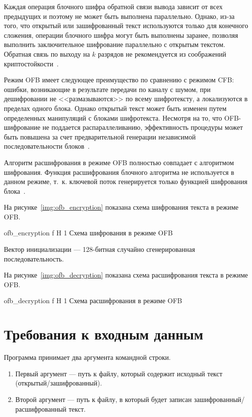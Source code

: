 \documentclass{bmstu}
\begin{document}
Каждая операция блочного шифра обратной связи вывода зависит от всех предыдущих и поэтому не может быть выполнена параллельно. 
Однако, из-за того, что открытый или зашифрованный текст используются только для конечного сложения, операции блочного шифра могут быть выполнены заранее, позволяя выполнить заключительное шифрование параллельно с открытым текстом. 
Обратная связь по выходу на $k$ разрядов не рекомендуется из соображений криптостойкости~\cite{wiki-ofb}.

Режим OFB имеет следующее преимущество по сравнению с режимом CFB: ошибки, возникающие в результате передачи по каналу с шумом, при дешифровании не <<размазываются>> по всему шифротексту, а локализуются в пределах одного блока. 
Однако открытый текст может быть изменен путем определенных манипуляций с блоками шифротекста. 
Несмотря на то, что OFB-шифрование не поддается распараллеливанию, эффективность процедуры может быть повышена за счет предварительной генерации независимой последовательности блоков~\cite{wiki-ofb}.

Алгоритм расшифрования в режиме OFB полностью совпадает с алгоритмом шифрования. Функция расшифрования блочного алгоритма не используется в данном режиме, т.~к. ключевой поток генерируется только функцией шифрования блока~\cite{wiki-ofb}.

На рисунке~\ref{img:ofb_encryption} показана схема шифрования текста в режиме OFB.

    {ofb_encryption}
    {f}
    {H}
    {1\textwidth}
    {Схема шифрования в режиме OFB~\cite{wiki-ofb}}
    
Вектор инициализации --- 128-битная случайно сгенерированная последовательность.

На рисунке~\ref{img:ofb_decryption} показана схема расшифрования текста в режиме OFB.

    {ofb_decryption}
    {f}
    {H}
    {1\textwidth}
    {Схема расшифрования в режиме OFB~\cite{wiki-ofb}}

\chapter{Требования к входным данным}

Программа принимает два аргумента командной строки.
\begin{enumerate}
\item Первый аргумент --- путь к файлу, который содержит исходный текст (открытый/зашифрованный).
\item Второй аргумент --- путь к файлу, в который будет записан зашифрованный/расшифрованный текст. 
\end{enumerate}
\end{document}
